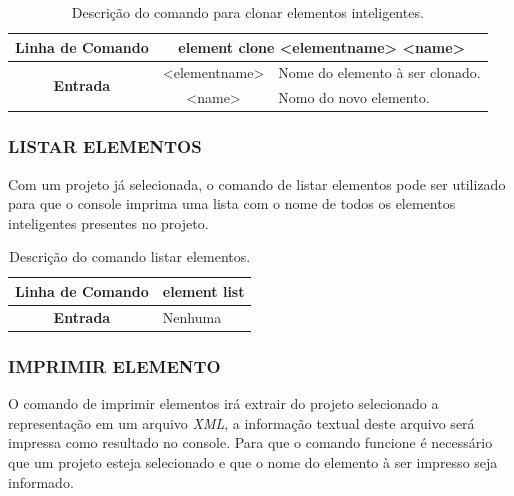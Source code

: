 \documentclass[a4paper,12pt]{monografia}
\theoremstyle{plain}
\theoremstyle{definition}
\theoremstyle{remark}
\begin{document}
\begin{center}
	\begin{table}[!htbp]
		\begin{tabular}{|c|c|m{}|}
			\hline
			\textbf{Linha de Comando} & \multicolumn{2}{c|}{element clone <element\underline{\space\space}name> <name>} \\
			\hline
			\multirow{2}{*}{\textbf{Entrada}} & <element\underline{\space\space}name> & Nome do elemento à ser clonado. \\
			
			& <name> & Nomo do novo elemento. \\
			\hline
		\end{tabular}
		\caption{Descrição do comando para clonar elementos inteligentes.}
		\label{tab:clone_element}
	\end{table}
\end{center}

\subsubsection{LISTAR ELEMENTOS}\label{sec:list_element}

Com um projeto já selecionada, o comando de listar elementos pode ser utilizado para que o console imprima uma lista com o nome de todos os elementos inteligentes presentes no projeto.

\begin{center}
\begin{table}[!htbp]
	\begin{tabular}{|c|m{}|}
		\hline
		\textbf{Linha de Comando} & \multicolumn{1}{c|}{element list} \\
		\hline
		\textbf{Entrada} & Nenhuma \\
		\hline
	\end{tabular}
	\caption{Descrição do comando listar elementos.}
	\label{tab:list_element}
\end{table}
\end{center}

\subsubsection{IMPRIMIR ELEMENTO}\label{sec:print_element}

O comando de imprimir elementos irá extrair do projeto selecionado a representação em um arquivo \textit{XML}, a informação textual deste arquivo será impressa como resultado no console. Para que o comando funcione é necessário que um projeto esteja selecionado e que o nome do elemento à ser impresso seja informado.
\end{document}
